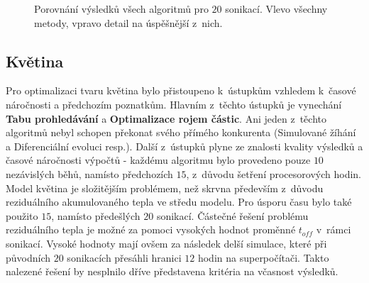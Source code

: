 \begin{figure}[H]
    \caption{Porovnání výsledků všech algoritmů pro $20$ sonikací. Vlevo všechny metody, vpravo detail na úspěšnější z~nich.}
    \label{fg:hifu:blob:joined}
\end{figure}


\subsection{Květina}
Pro optimalizaci tvaru květina bylo přistoupeno k~ústupkům vzhledem k~časové náročnosti a předchozím poznatkům. Hlavním z~těchto ústupků je vynechání \textbf{Tabu prohledávání} a \textbf{Optimalizace rojem částic}. Ani jeden z~těchto algoritmů nebyl schopen překonat svého přímého konkurenta (Simulované žíhání a Diferenciální evoluci resp.). Další z~ústupků plyne ze znalosti kvality výsledků a časové náročnosti výpočtů - každému algoritmu bylo provedeno pouze $10$ nezávislých běhů, namísto předchozích $15$, z~důvodu šetření procesorových hodin. Model květina je složitějším problémem, než skrvna především z~důvodu reziduálního akumulovaného tepla ve středu modelu. Pro úsporu času bylo také použito $15$, namísto předešlých $20$ sonikací. Částečné řešení problému reziduálního tepla je možné za pomoci vysokých hodnot proměnné $t_{off}$ v~rámci sonikací. Vysoké hodnoty mají ovšem za následek delší simulace, které při původních $20$ sonikacích přesáhli hranici $12$ hodin na superpočítači. Takto nalezené řešení by nesplnilo dříve představena kritéria na včasnost výsledků.

